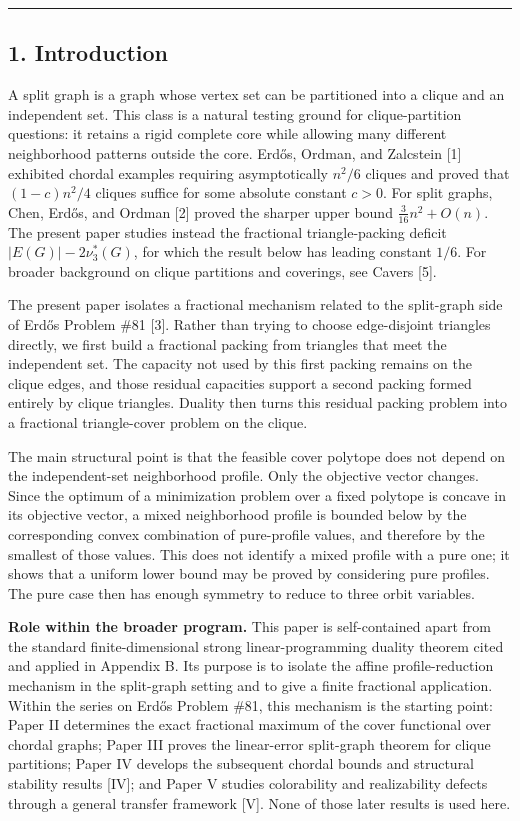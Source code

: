 \documentclass[english,11pt,a4paper]{article}
\begin{document}
\begin{center}\rule{0.5\linewidth}{0.5pt}\end{center}

\subsection{1. Introduction}\label{introduction}

A split graph is a graph whose vertex set can be partitioned into a
clique and an independent set. This class is a natural testing ground
for clique-partition questions: it retains a rigid complete core while
allowing many different neighborhood patterns outside the core. Erdős,
Ordman, and Zalcstein {[}1{]} exhibited chordal examples requiring
asymptotically \(n^2/6\) cliques and proved that \((1-c)n^2/4\) cliques
suffice for some absolute constant \(c>0\). For split graphs, Chen,
Erdős, and Ordman {[}2{]} proved the sharper upper bound
\(\frac{3}{16}n^2+O(n)\). The present paper studies instead the
fractional triangle-packing deficit \(|E(G)|-2\nu_3^*(G)\), for which
the result below has leading constant \(1/6\). For broader background on
clique partitions and coverings, see Cavers {[}5{]}.

The present paper isolates a fractional mechanism related to the
split-graph side of Erdős Problem \#81 {[}3{]}. Rather than trying to
choose edge-disjoint triangles directly, we first build a fractional
packing from triangles that meet the independent set. The capacity not
used by this first packing remains on the clique edges, and those
residual capacities support a second packing formed entirely by clique
triangles. Duality then turns this residual packing problem into a
fractional triangle-cover problem on the clique.

The main structural point is that the feasible cover polytope does not
depend on the independent-set neighborhood profile. Only the objective
vector changes. Since the optimum of a minimization problem over a fixed
polytope is concave in its objective vector, a mixed neighborhood
profile is bounded below by the corresponding convex combination of
pure-profile values, and therefore by the smallest of those values. This
does not identify a mixed profile with a pure one; it shows that a
uniform lower bound may be proved by considering pure profiles. The pure
case then has enough symmetry to reduce to three orbit variables.

\textbf{Role within the broader program.} This paper is self-contained
apart from the standard finite-dimensional strong linear-programming
duality theorem cited and applied in Appendix B. Its purpose is to
isolate the affine profile-reduction mechanism in the split-graph
setting and to give a finite fractional application. Within the series
on Erdős Problem \#81, this mechanism is the starting point: Paper II
determines the exact fractional maximum of the cover functional over
chordal graphs; Paper III proves the linear-error split-graph theorem
for clique partitions; Paper IV develops the subsequent chordal bounds
and structural stability results {[}IV{]}; and Paper V studies
colorability and realizability defects through a general transfer
framework {[}V{]}. None of those later results is used here.
\end{document}
